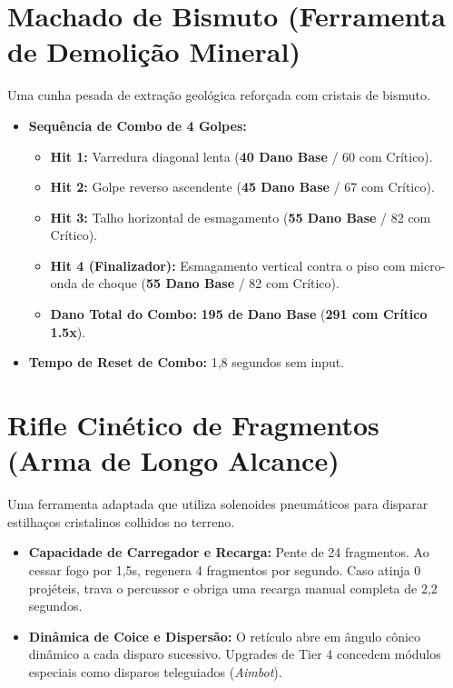 \documentclass[a4paper,12pt]{report}
\begin{document}
\section{Machado de Bismuto (Ferramenta de Demolição Mineral)}
Uma cunha pesada de extração geológica reforçada com cristais de bismuto.
\begin{itemize}
    \item \textbf{Sequência de Combo de 4 Golpes:}
    \begin{itemize}
        \item \textbf{Hit 1:} Varredura diagonal lenta (\textbf{40 Dano Base} / 60 com Crítico).
        \item \textbf{Hit 2:} Golpe reverso ascendente (\textbf{45 Dano Base} / 67 com Crítico).
        \item \textbf{Hit 3:} Talho horizontal de esmagamento (\textbf{55 Dano Base} / 82 com Crítico).
        \item \textbf{Hit 4 (Finalizador):} Esmagamento vertical contra o piso com micro-onda de choque (\textbf{55 Dano Base} / 82 com Crítico).
        \item \textbf{Dano Total do Combo:} \textbf{195 de Dano Base} (\textbf{291 com Crítico 1.5x}).
    \end{itemize}
    \item \textbf{Tempo de Reset de Combo:} 1,8 segundos sem input.
\end{itemize}

\section{Rifle Cinético de Fragmentos (Arma de Longo Alcance)}
Uma ferramenta adaptada que utiliza solenoides pneumáticos para disparar estilhaços cristalinos colhidos no terreno.
\begin{itemize}
    \item \textbf{Capacidade de Carregador e Recarga:} Pente de 24 fragmentos. Ao cessar fogo por 1,5s, regenera 4 fragmentos por segundo. Caso atinja 0 projéteis, trava o percussor e obriga uma recarga manual completa de 2,2 segundos.
    \item \textbf{Dinâmica de Coice e Dispersão:} O retículo abre em ângulo cônico dinâmico a cada disparo sucessivo. Upgrades de Tier 4 concedem módulos especiais como disparos teleguiados (\textit{Aimbot}).
\end{itemize}
\end{document}
